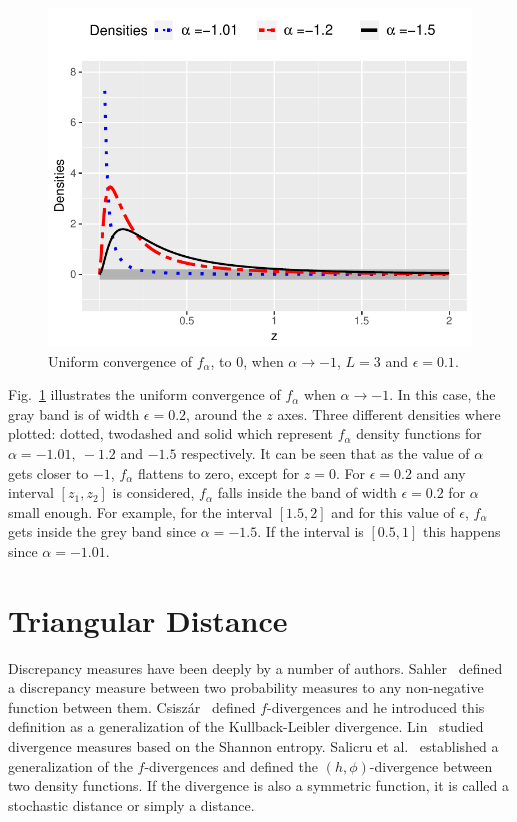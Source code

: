 \documentclass[technote,onecolumn,draftcls,12pt]{IEEEtran}
\numberwithin{equation}{section}
\begin{document}
\begin{figure}[hbt]
	\centering    
	\includegraphics[width=\linewidth]{../../../Figures/DTTeorico/ConvUnifEnCero.pdf}
	\caption{\label{ConvEnCero}Uniform convergence of $f_{\alpha}$, to $0$, when $\alpha \to -1$, $L=3$ and $\epsilon=0.1$.}
\end{figure}

Fig.~\ref{ConvEnCero} illustrates the uniform convergence of $f_{\alpha}$ when $\alpha \to -1$. 
In this case, the gray band is of width $\epsilon=0.2$, around the $z$ axes. 
Three different densities where plotted: dotted, twodashed and solid which represent $f_{\alpha}$ density functions for $\alpha=-1.01, \ -1.2$ and $-1.5$ respectively. 
It can be seen that as the value of $\alpha$ gets closer to $-1$, $f_{\alpha}$ flattens to zero, except for $z=0$. 
For  $\epsilon=0.2$ and any interval $[z_1,z_2]$ is considered, $f_{\alpha}$ falls inside the band of width $\epsilon=0.2$ for $\alpha$ small enough. 
For example, for the interval $[1.5,2]$ and for this value of $\epsilon$, $f_{\alpha}$ gets inside the grey band since $\alpha=-1.5$. 
If the interval is $[0.5,1]$ this happens since $\alpha=-1.01$.
\section{Triangular Distance}
\label{DTsection}

Discrepancy measures have been deeply by a number of authors. 
Sahler~\cite{Sahler1970} defined a discrepancy measure between two probability measures to any non-negative function between them. 
Csisz\'ar~\cite{Csiszar1967} defined $f$-divergences and he introduced this definition as a generalization of the Kullback-Leibler divergence. 
Lin~\cite{Lin1991} studied divergence measures based on the Shannon entropy.  
Salicru et al.~\cite{Salicru1994} established a generalization of the $f$-divergences and defined the $(h,\phi)$-divergence between two density functions. 
If the divergence is also a symmetric function, it is called a stochastic distance or simply a distance.
\end{document}

